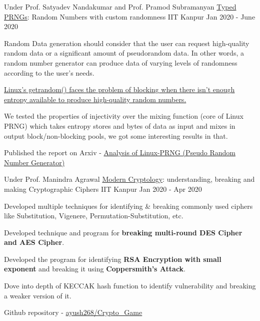 \begin{cventries}


  \cventry
    {Under Prof. Satyadev Nandakumar and Prof. Pramod Subramanyan} %
    {\href{https://arxiv.org/abs/2312.03369}{Typed PRNGs}: Random Numbers with custom randomness} %
    {IIT Kanpur} %
    {Jan 2020 - June 2020} %
    {
      \begin{cvitems} %
      \item Random Data generation should consider that the user can request high-quality random data or a significant amount of pseudorandom data. In other words, a random number generator can produce data of varying levels of randomness according to the user's needs.
      \item \href{https://lwn.net/Articles/800509/}{Linux's getrandom() faces the problem of blocking when there isn't enough entropy available to produce high-quality random numbers.}
      \item We tested the properties of injectivity over the mixing function (core of Linux PRNG) which takes entropy stores and bytes of data as input and mixes in output block/non-blocking pools, we got some interesting results in that.
      \item Published the report on Arxiv - \href{https://arxiv.org/abs/2312.03369}{Analysis of Linux-PRNG (Pseudo Random Number Generator)}
      \end{cvitems}
    }



  \cventry
    {Under Prof. Manindra Agrawal} %
    {\href{https://github.com/ayush268/Crypto_Game}{Modern Cryptology}: understanding, breaking and making Cryptographic Ciphers} %
    {IIT Kanpur} %
    {Jan 2020 - Apr 2020} %
    {
      \begin{cvitems} %
      \item {Developed multiple techniques for identifying \& breaking commonly used ciphers like Substitution, Vigenere, Permutation-Substitution, etc.}
      \item {Developed technique and program for \textbf{breaking multi-round DES Cipher and AES Cipher}.}
      \item {Developed the program for identifying \textbf{RSA Encryption with small exponent} and breaking it using \textbf{Coppersmith’s Attack}.}
      \item {Dove into depth of KECCAK hash function to identify vulnerability and breaking a weaker version of it.}
      \item {Github repository - \href{https://github.com/ayush268/Crypto_Game}{ayush268/Crypto\_Game}}
      \end{cvitems}
    }


\end{cventries}

